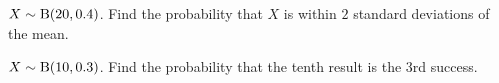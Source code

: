 \begin{minipage}[t]{0.48\textwidth}
\exlab $X\sim\mathrm{B}(20,0.4)$. Find the probability that $X$ is within $2$ standard deviations of the mean.
\end{minipage}\par\medskip
\noindent\begin{minipage}[t]{0.48\textwidth}
\exlab $X\sim\mathrm{B}(10,0.3)$. Find the probability that the tenth result is the 3rd success.
\end{minipage}
